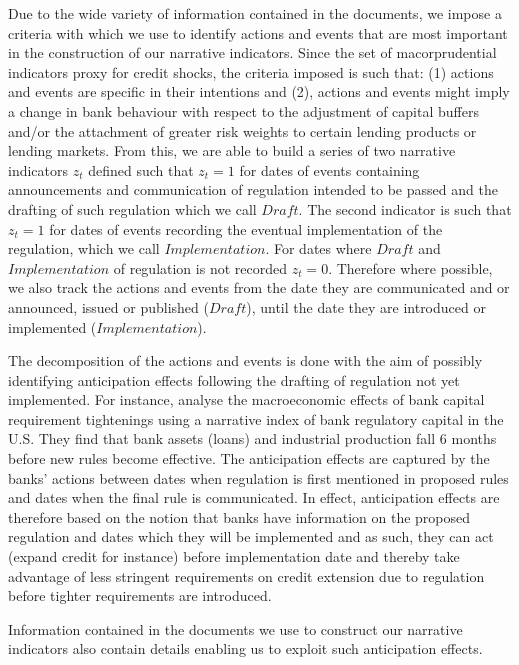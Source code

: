 \documentclass[
  letterpaper,
  DIV=11,
  numbers=noendperiod]{scrartcl}
\begin{document}
Due to the wide variety of information contained in the documents, we
impose a criteria with which we use to identify actions and events that
are most important in the construction of our narrative indicators.
Since the set of macorprudential indicators proxy for credit shocks, the
criteria imposed is such that: (1) actions and events are specific in
their intentions and (2), actions and events might imply a change in
bank behaviour with respect to the adjustment of capital buffers and/or
the attachment of greater risk weights to certain lending products or
lending markets. From this, we are able to build a series of two
narrative indicators \(z_{t}\) defined such that \(z_{t}=1\) for dates
of events containing announcements and communication of regulation
intended to be passed and the drafting of such regulation which we call
\(Draft\). The second indicator is such that \(z_{t}=1\) for dates of
events recording the eventual implementation of the regulation, which we
call \(Implementation\). For dates where \(Draft\) and
\(Implementation\) of regulation is not recorded \(z_{t}=0\). Therefore
where possible, we also track the actions and events from the date they
are communicated and or announced, issued or published (\(Draft\)),
until the date they are introduced or implemented (\(Implementation\)).

The decomposition of the actions and events is done with the aim of
possibly identifying anticipation effects following the drafting of
regulation not yet implemented. For instance,
\cite{eickmeier2018macroeconomic} analyse the macroeconomic effects of
bank capital requirement tightenings using a narrative index of bank
regulatory capital in the U.S. They find that bank assets (loans) and
industrial production fall 6 months before new rules become effective.
The anticipation effects are captured by the banks' actions between
dates when regulation is first mentioned in proposed rules and dates
when the final rule is communicated. In effect, anticipation effects are
therefore based on the notion that banks have information on the
proposed regulation and dates which they will be implemented and as
such, they can act (expand credit for instance) before implementation
date and thereby take advantage of less stringent requirements on credit
extension due to regulation before tighter requirements are introduced.

Information contained in the documents we use to construct our narrative
indicators also contain details enabling us to exploit such anticipation
effects.
\end{document}
